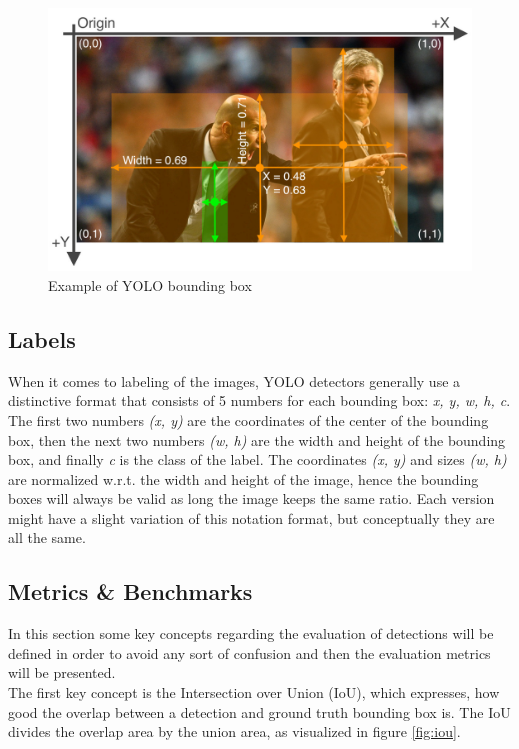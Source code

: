 \begin{figure}[!h]
  \includegraphics[width=\textwidth]{images/yolo_labels_zidane}
  \centering
  \caption{Example of YOLO bounding box \cite{yolov5_train_custom}}
\end{figure}

\subsection{Labels}
When it comes to labeling of the images, YOLO detectors generally use a distinctive format that consists of 5 numbers for each bounding box: \textit{x, y, w, h, c}. The first two numbers \textit{(x, y)} are the coordinates of the center of the bounding box, then the next two numbers \textit{(w, h)} are the width and height of the bounding box, and finally \textit{c} is the class of the label. The coordinates \textit{(x, y)} and sizes \textit{(w, h)} are normalized w.r.t. the width and height of the image, hence the bounding boxes will always be valid as long the image keeps the same ratio. Each version might have a slight variation of this notation format, but conceptually they are all the same.

\subsection{Metrics \& Benchmarks}
In this section some key concepts regarding the evaluation of detections will be defined in order to avoid any sort of confusion and then the evaluation metrics will be presented. \\
The first key concept is the Intersection over Union (IoU), which expresses, how good the overlap between a detection and ground truth bounding box is. The IoU divides the overlap area by the union area, as visualized in figure \ref{fig:iou}.

